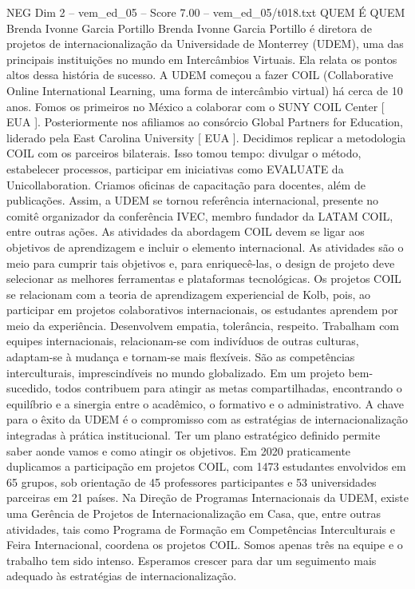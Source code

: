 \begin{textsample}{NEG Dim 2 – vem\_ed\_05 – Score 7.00 – vem\_ed\_05/t018.txt}  \label{ex:f2_neg_095}
QUEM É QUEM Brenda Ivonne Garcia Portillo Brenda Ivonne Garcia Portillo é diretora de projetos de internacionalização da Universidade de Monterrey (UDEM), uma das principais instituições no mundo em Intercâmbios Virtuais.
Ela relata os pontos altos dessa história de sucesso.
A UDEM começou a fazer COIL (Collaborative Online International Learning, uma forma de intercâmbio virtual) há cerca de 10 anos.
Fomos os primeiros no México a colaborar com o SUNY COIL Center [ EUA ].
Posteriormente nos afiliamos ao consórcio Global Partners for Education, liderado pela East Carolina University [ EUA ].
Decidimos replicar a metodologia COIL com os parceiros bilaterais.
Isso tomou tempo: divulgar o método, estabelecer processos, participar em iniciativas como EVALUATE da Unicollaboration.
Criamos oficinas de capacitação para docentes, além de publicações.
Assim, a UDEM se tornou referência internacional, presente no comitê organizador da conferência IVEC, membro fundador da LATAM COIL, entre outras ações.
As atividades da abordagem COIL devem se ligar aos objetivos de aprendizagem e incluir o elemento internacional.
As atividades são o meio para cumprir tais objetivos e, para enriquecê-las, o design de projeto deve selecionar as melhores ferramentas e plataformas tecnológicas.
Os projetos COIL se relacionam com a teoria de aprendizagem experiencial de Kolb, pois, ao participar em projetos colaborativos internacionais, os estudantes aprendem por meio da experiência.
Desenvolvem empatia, tolerância, respeito.
Trabalham com equipes internacionais, relacionam-se com indivíduos de outras culturas, adaptam-se à mudança e tornam-se mais flexíveis.
São as competências interculturais, imprescindíveis no mundo globalizado.
Em um projeto bem-sucedido, todos contribuem para atingir as metas compartilhadas, encontrando o equilíbrio e a sinergia entre o acadêmico, o formativo e o administrativo.
A chave para o êxito da UDEM é o compromisso com as estratégias de internacionalização integradas à prática institucional.
Ter um plano estratégico definido permite saber aonde vamos e como atingir os objetivos.
Em 2020 praticamente duplicamos a participação em projetos COIL, com 1473 estudantes envolvidos em 65 grupos, sob orientação de 45 professores participantes e 53 universidades parceiras em 21 países.
Na Direção de Programas Internacionais da UDEM, existe uma Gerência de Projetos de Internacionalização em Casa, que, entre outras atividades, tais como Programa de Formação em Competências Interculturais e Feira Internacional, coordena os projetos COIL.
Somos apenas três na equipe e o trabalho tem sido intenso.
Esperamos crescer para dar um seguimento mais adequado às estratégias de internacionalização.

\end{textsample}
